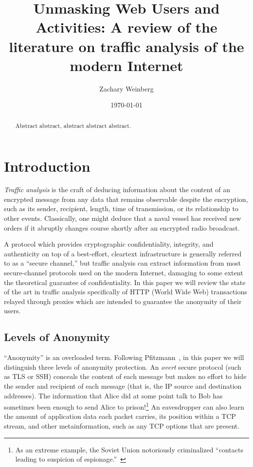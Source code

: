 \title{Unmasking Web Users and Activities:
  A review of the literature on traffic analysis of the modern Internet}
\author{Zachary Weinberg}
\date{\today}
\maketitle

\begin{abstract}
Abstract abstract, abstract abstract abstract.
\end{abstract}

\section{Introduction}

\emph{Traffic analysis} is the craft of deducing information about the
content of an encrypted message from any data that remains observable
despite the encryption, such as its sender, recipient, length, time of
transmission, or its relationship to other events.  Classically, one
might deduce that a naval vessel has received new orders if it
abruptly changes course shortly after an encrypted radio broadcast.

A protocol which provides cryptographic confidentiality, integrity,
and authenticity on top of a best-effort, cleartext infrastructure is
generally referred to as a “secure channel,” but traffic analysis can
extract information from most secure-channel protocols used on the
modern Internet, damaging to some extent the theoretical guarantee of
confidentiality.  In this paper we will review the state of the art in
traffic analysis specifically of HTTP (World Wide Web) transactions
relayed through proxies which are intended to guarantee the anonymity
of their users.

\subsection{Levels of Anonymity}

“Anonymity” is an overloaded term.  Following
Pfitzmann~\cite{pfitzmann2010terminology}, in this paper we will
distinguish three levels of anonymity protection.  An \emph{overt}
secure protocol (such as TLS or SSH) conceals the content of each
message but makes no effort to hide the sender and recipient of each
message (that is, the IP source and destination addresses).  The
information that Alice did at some point talk to Bob has sometimes
been enough to send Alice to prison!\footnote{As an extreme example,
  the Soviet Union notoriously criminalized “contacts leading to
  suspicion of espionage.”~\cite{solzh1974gulag:svpsh}} An
eavesdropper can also learn the amount of application data each packet
carries, its position within a TCP stream, and other metainformation,
such as any TCP options that are present.


